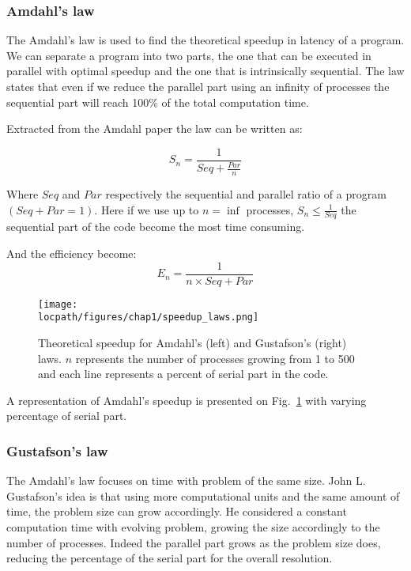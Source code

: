 \subsubsection{Amdahl's law}
The Amdahl's law\cite{amdahl1967validity} is used to find the theoretical speedup in latency of a program.
We can separate a program into two parts, the one that can be executed in parallel with optimal speedup and the one that is intrinsically sequential.
The law states that even if we reduce the parallel part using an infinity of processes the sequential part will reach 100\% of the total computation time. 

Extracted from the Amdahl paper the law can be written as: 

\begin{equation}
S_n = \frac{1}{Seq + \frac{Par}{n}}
\end{equation}

Where $Seq$ and $Par$ respectively the sequential and parallel ratio of a program $( Seq + Par = 1 )$.
Here if we use up to $n=\inf$ processes, $S_n \leq \frac{1}{Seq}$ the sequential part of the code become the most time consuming. 

And the efficiency become:
\begin{equation}
E_n = \frac{1}{n\times Seq + Par}
\end{equation}

\begin{figure}
\texttt{[image: \\locpath/figures/chap1/speedup\_laws.png]}
\caption[Amdahl's and Gustafson laws theoretical speedup]{Theoretical speedup for Amdahl's (left) and Gustafson's (right) laws. $n$ represents the number of processes growing from 1 to 500 and each line represents a percent of serial part in the code.}
\label{fig:1_HPC:speedup_laws}
\end{figure}

A representation of Amdahl's speedup is presented on Fig.~\ref{fig:1_HPC:speedup_laws} with varying percentage of serial part. 

\subsubsection{Gustafson's law}
The Amdahl's law focuses on time with problem of the same size. 
John L. Gustafson's idea \cite{gustafson1988reevaluating} is that using more computational units and the same amount of time, the problem size can grow accordingly. 
He considered a constant computation time with evolving problem, growing the size accordingly to the number of processes. 
Indeed the parallel part grows as the problem size does, reducing the percentage of the serial part for the overall resolution.

